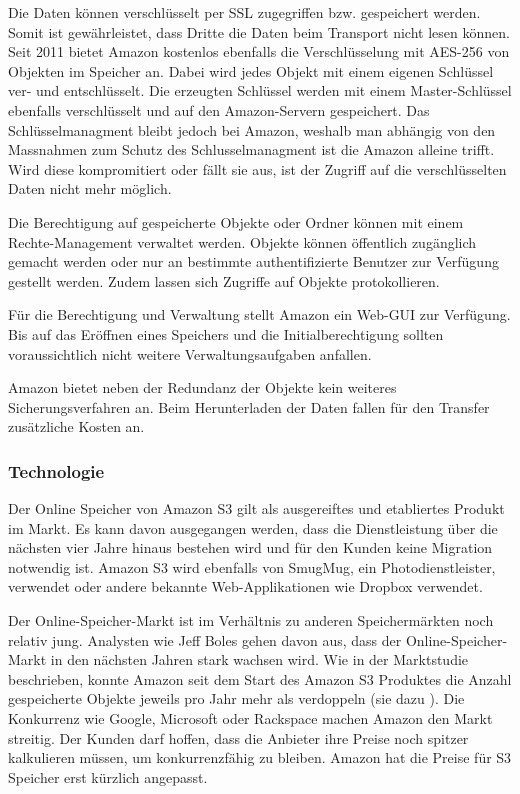 Die Daten können verschlüsselt per SSL zugegriffen bzw. gespeichert werden. Somit ist gewährleistet, dass Dritte die Daten beim Transport nicht lesen können. Seit 2011 bietet Amazon kostenlos ebenfalls die Verschlüsselung mit AES-256 von Objekten im Speicher an. Dabei wird jedes Objekt mit einem eigenen Schlüssel ver- und entschlüsselt. Die erzeugten Schlüssel werden mit einem Master-Schlüssel ebenfalls verschlüsselt und auf den Amazon-Servern gespeichert. Das Schlüsselmanagment bleibt jedoch bei Amazon, weshalb man abhängig von den Massnahmen zum Schutz des Schlusselmanagment ist die Amazon alleine trifft. Wird diese kompromitiert oder fällt sie aus, ist der Zugriff auf die verschlüsselten Daten nicht mehr möglich. \cite{RobertLippert2011}

Die Berechtigung auf gespeicherte Objekte oder Ordner können mit einem Rechte-Management verwaltet werden. Objekte können öffentlich zugänglich gemacht werden oder nur an bestimmte authentifizierte Benutzer zur Verfügung gestellt werden. Zudem lassen sich Zugriffe auf Objekte protokollieren. \cite{Amazon2012b}

Für die Berechtigung und Verwaltung stellt Amazon ein Web-GUI zur Verfügung. Bis auf das Eröffnen eines Speichers und die Initialberechtigung sollten voraussichtlich nicht weitere Verwaltungsaufgaben anfallen.

Amazon bietet neben der Redundanz der Objekte kein weiteres Sicherungsverfahren an. Beim Herunterladen der Daten fallen für den Transfer zusätzliche Kosten an.

\subsubsection*{Technologie}
Der Online Speicher von Amazon S3 gilt als ausgereiftes und etabliertes Produkt im Markt. Es kann davon ausgegangen werden, dass die Dienstleistung über die nächsten vier Jahre hinaus bestehen wird und für den Kunden keine Migration notwendig ist. Amazon S3 wird ebenfalls von SmugMug, ein Photodienstleister, verwendet oder andere bekannte Web-Applikationen wie Dropbox verwendet. \cite{SmugMug}\cite{Dropbox2011}

Der Online-Speicher-Markt ist im Verhältnis zu anderen Speichermärkten noch relativ jung. Analysten wie Jeff Boles gehen davon aus, dass der Online-Speicher-Markt in den nächsten Jahren stark wachsen wird. Wie in der Marktstudie beschrieben, konnte Amazon seit dem Start des Amazon S3 Produktes die Anzahl gespeicherte Objekte jeweils pro Jahr mehr als verdoppeln (sie dazu ). Die Konkurrenz wie Google, Microsoft oder Rackspace machen Amazon den Markt streitig. Der Kunden darf hoffen, dass die Anbieter ihre Preise noch spitzer kalkulieren müssen, um konkurrenzfähig zu bleiben. Amazon hat die Preise für S3 Speicher erst kürzlich angepasst. \cite{Boles2011}\cite{Barr2012a}


